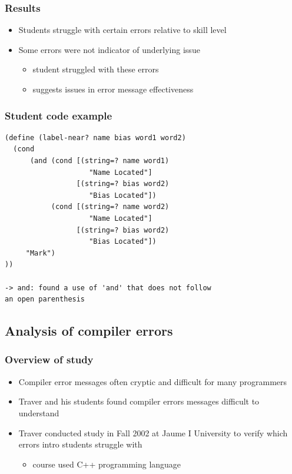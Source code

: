 \documentclass{beamer}
\begin{document}
\begin{frame}
	\frametitle{Results}
		\begin{itemize}
			\item Students struggle with certain errors relative to skill level
			\item Some errors were not indicator of underlying issue
			\begin{itemize}
			\item student struggled with these errors
			\item suggests issues in error message effectiveness
			\end{itemize}
		\end{itemize}

\end{frame}

\begin{frame}[fragile]
 \frametitle{Student code example}
 			\begin{verbatim}
(define (label-near? name bias word1 word2)
  (cond
      (and (cond [(string=? name word1) 
                    "Name Located"]
                 [(string=? bias word2)
                    "Bias Located"])
           (cond [(string=? name word2)
                    "Name Located"]
                 [(string=? bias word2) 
                    "Bias Located"])
     "Mark")
))

-> and: found a use of 'and' that does not follow 
an open parenthesis
			\end{verbatim}
\end{frame}

\subsection[Compiler Analysis]{Analysis of compiler errors}

\begin{frame}
	\frametitle{Overview of study}
		\begin{itemize}
			\item Compiler error messages often cryptic and difficult for many programmers
			\item Traver and his students found compiler errors messages difficult to understand
			\item Traver conducted study in Fall 2002 at Jaume I University to verify which errors intro students struggle with
				\begin{itemize}
				\item course used C++ programming language
				\end{itemize}
		\end{itemize}

\end{frame}
\end{document}
